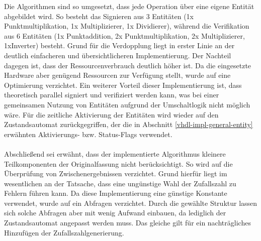 Die Algorithmen sind so umgesetzt, dass jede Operation über eine eigene Entität abgebildet wird. So besteht das Signieren aus 3 Entitäten (1x Punktmultiplikation, 1x Multiplizierer, 1x Dividierer), während die Verifikation aus 6 Entitäten (1x Punktaddition, 2x Punktmultiplikation, 2x Multiplizierer, 1xInverter) besteht. Grund für die Verdopplung liegt in erster Linie an der deutlich einfacheren und übersichtlicheren Implementierung. Der Nachteil dagegen ist, dass der Ressourcenverbrauch deutlich höher ist. Da die eingesetzte Hardware aber genügend Ressourcen zur Verfügung stellt, wurde auf eine Optimierung verzichtet. Ein weiterer Vorteil dieser Implementierung ist, dass theoretisch parallel signiert und verifiziert werden kann, was bei einer gemeinsamen Nutzung von Entitäten aufgrund der Umschaltlogik nicht möglich wäre. Für die zeitliche Aktivierung der Entitäten wird wieder auf den Zustandsautomat zurückgegriffen, der die in Abschnitt \ref{vhdl-impl-general-entity} erwähnten Aktivierungs- bzw. Status-Flags verwendet.
\\ \\
Abschließend sei erwähnt, dass der implementierte Algorithmus kleinere Teilkomponenten der Originalfassung nicht berücksichtigt. So wird auf die Überprüfung von Zwischenergebnissen verzichtet. Grund hierfür liegt im wesentlichen an der Tatsache, dass eine ungünstige Wahl der Zufallszahl zu Fehlern führen kann. Da diese Implementierung eine günstige Konstante verwendet, wurde auf ein Abfragen verzichtet. Durch die gewählte Struktur lassen sich  solche Abfragen aber mit wenig Aufwand einbauen, da lediglich der Zustandsautomat angepasst werden muss. Das gleiche gilt für ein nachträgliches Hinzufügen der Zufallszahlgenerierung. \\

